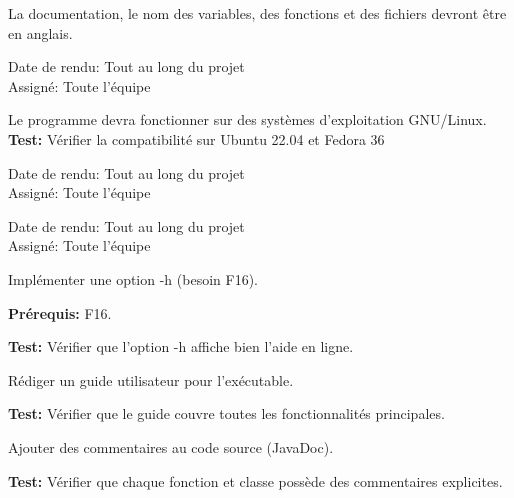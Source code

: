 \documentclass{article}
\begin{document}
\begin{nonfunctionnalneedbox}
    La documentation, le nom des variables, des fonctions et des fichiers devront être en anglais.
    \begin{duedatebox}
        Date de rendu: Tout au long du projet\\
        Assigné: Toute l'équipe
    \end{duedatebox}
\end{nonfunctionnalneedbox}

\begin{nonfunctionnalneedbox}
    Le programme devra fonctionner sur des systèmes d’exploitation GNU/Linux. \\
    \textbf{Test:} Vérifier la compatibilité sur Ubuntu 22.04 et Fedora 36
    \begin{duedatebox}
        Date de rendu: Tout au long du projet\\
        Assigné: Toute l'équipe
    \end{duedatebox}
\end{nonfunctionnalneedbox}

\begin{nonfunctionnalneedbox}[F5. Documentation]
    \begin{duedatebox}
        Date de rendu: Tout au long du projet\\
        Assigné: Toute l'équipe
    \end{duedatebox}
    \begin{subneedbox}[F5.1: Option -h]
        Implémenter une option -h (besoin F16).

        \textbf{Prérequis:} F16.

        \textbf{Test:} Vérifier que l'option -h affiche bien l'aide en ligne.
    \end{subneedbox}
    
    \begin{subneedbox}
        Rédiger un guide utilisateur pour l'exécutable.

        \textbf{Test:} Vérifier que le guide couvre toutes les fonctionnalités principales.
    \end{subneedbox}
    
    \begin{subneedbox}
        Ajouter des commentaires au code source (JavaDoc).

        \textbf{Test:} Vérifier que chaque fonction et classe possède des commentaires explicites.
    \end{subneedbox}
\end{nonfunctionnalneedbox}
\end{document}
